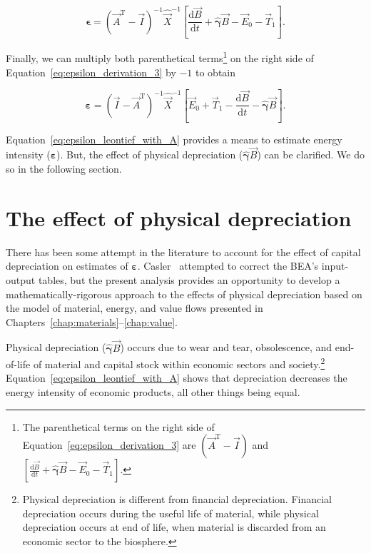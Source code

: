 \begin{equation} \label{eq:epsilon_derivation_3}
	\bm{\epsilon}
	= {(\vec{A}^{\mathrm{T}} - \vec{I})}^{-1} {\hat{\vec{X}}}^{-1} 
		\left[
			\frac{\mathrm{d}\vec{B}}{\mathrm{d}t}
			+ \hat{\bm{\gamma}} \vec{B}
			- \vec{E}_{0}
			- \vec{T}_{1} 
		\right].
\end{equation}

\noindent{}Finally, we can multiply both parenthetical terms\footnote{The parenthetical
terms on the right side of Equation~\ref{eq:epsilon_derivation_3} 
are $(\vec{A}^{\mathrm{T}} - \vec{I})$ and
$
\left[
	\frac{\mathrm{d}\vec{B}}{\mathrm{d}t}
	+ \hat{\bm{\gamma}} \vec{B}
	- \vec{E}_{0}
	- \vec{T}_{1} 
\right]
$.} 
on the right side of Equation~\ref{eq:epsilon_derivation_3} by $-1$ to obtain

\begin{equation} \label{eq:epsilon_leontief_with_A}
	\bm{\varepsilon} 
	= {(\vec{I} - \vec{A}^{\mathrm{T}})}^{-1}\hat{\vec{X}}^{-1}
		\left[\vec{E}_{0} 
				+ \vec{T}_{1} 
				- \frac{\mathrm{d}\vec{B}}{\mathrm{d}t} 
				- \hat{\bm{\gamma}}\vec{B}
		\right].
\end{equation}

Equation~\ref{eq:epsilon_leontief_with_A} provides a means 
to estimate energy intensity ($\bm{\varepsilon}$). 
But, the effect of physical depreciation ($\hat{\bm{\gamma}}\vec{B}$) 
can be clarified.
We do so in the following section.

\section{The effect of physical depreciation}

There has been some attempt in the literature to 
account for the effect
of capital depreciation on estimates 
of $\bm{\varepsilon}$. 
Casler~\cite{Casler:1983uy} attempted to correct the BEA's
input-output tables,
but the present analysis provides an opportunity
to develop a mathematically-rigorous approach to the 
effects of physical depreciation based on 
the model of material, energy, and value flows presented 
in Chapters~\ref{chap:materials}--\ref{chap:value}.

Physical depreciation ($\hat{\bm{\gamma}}\vec{B}$)
occurs due to wear and tear, obsolescence, and end-of-life
of material and capital stock 
within economic sectors and society.\footnote{Physical depreciation
is different from financial depreciation. 
Financial depreciation occurs during the useful life of material, 
while physical depreciation occurs at end of life, 
when material is discarded from an economic sector to the biosphere.}
Equation~\ref{eq:epsilon_leontief_with_A} shows that 
depreciation decreases the energy intensity of economic products,
all other things being equal.

